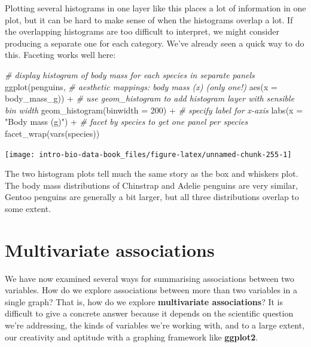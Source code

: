 \documentclass[
]{book}
\newenvironment{Shaded}{\begin{snugshade}}{\end{snugshade}}
\newcommand{\AttributeTok}[1]{\textcolor[rgb]{0.77,0.63,0.00}{#1}}
\newcommand{\CommentTok}[1]{\textcolor[rgb]{0.56,0.35,0.01}{\textit{#1}}}
\newcommand{\DecValTok}[1]{\textcolor[rgb]{0.00,0.00,0.81}{#1}}
\newcommand{\FunctionTok}[1]{\textcolor[rgb]{0.00,0.00,0.00}{#1}}
\newcommand{\NormalTok}[1]{#1}
\newcommand{\SpecialCharTok}[1]{\textcolor[rgb]{0.00,0.00,0.00}{#1}}
\newcommand{\StringTok}[1]{\textcolor[rgb]{0.31,0.60,0.02}{#1}}
\begin{document}
Plotting several histograms in one layer like this places a lot of information in one plot, but it can be hard to make sense of when the histograms overlap a lot. If the overlapping histograms are too difficult to interpret, we might consider producing a separate one for each category. We've already seen a quick way to do this. Faceting works well here:

\begin{Shaded}
\begin{Highlighting}[]
\CommentTok{\# display histogram of body mass for each species in separate panels}
\FunctionTok{ggplot}\NormalTok{(penguins,}
       \CommentTok{\# aesthetic mappings: body mass (x) (only one!)}
       \FunctionTok{aes}\NormalTok{(}\AttributeTok{x =}\NormalTok{ body\_mass\_g))  }\SpecialCharTok{+}
  \CommentTok{\# use geom\_histogram to add histogram layer with sensible bin width}
  \FunctionTok{geom\_histogram}\NormalTok{(}\AttributeTok{binwidth =} \DecValTok{200}\NormalTok{) }\SpecialCharTok{+} 
  \CommentTok{\# specify label for x{-}axis}
  \FunctionTok{labs}\NormalTok{(}\AttributeTok{x =} \StringTok{"Body mass (g)"}\NormalTok{) }\SpecialCharTok{+}
  \CommentTok{\# facet by species to get one panel per species}
  \FunctionTok{facet\_wrap}\NormalTok{(}\FunctionTok{vars}\NormalTok{(species))}
\end{Highlighting}
\end{Shaded}

\begin{center}\texttt{[image: intro-bio-data-book\_files/figure-latex/unnamed-chunk-255-1]} \end{center}

The two histogram plots tell much the same story as the box and whiskers plot. The body mass distributions of Chinstrap and Adelie penguins are very similar, Gentoo penguins are generally a bit larger, but all three distributions overlap to some extent.

\hypertarget{multivariate}{%
\section{Multivariate associations}\label{multivariate}}

We have now examined several ways for summarising associations between two variables. How do we explore associations between more than two variables in a single graph? That is, how do we explore \textbf{multivariate associations}? It is difficult to give a concrete answer because it depends on the scientific question we're addressing, the kinds of variables we're working with, and to a large extent, our creativity and aptitude with a graphing framework like \textbf{ggplot2}.
\end{document}
